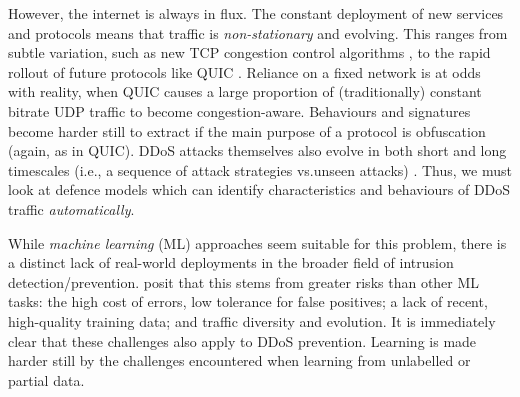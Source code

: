 \documentclass[10pt, times, conference, letterpaper]{IEEEtran}
\begin{document}
However, the internet is always in flux.
The constant deployment of new services and protocols means that traffic is \emph{non-stationary} and evolving.
This ranges from subtle variation, such as new TCP congestion control algorithms \cite{rfc8312}, to the rapid rollout \cite{DBLP:conf/pam/RuthPDH18} of future protocols like QUIC \cite{DBLP:conf/sigcomm/LangleyRWVKZYKS17}.
Reliance on a fixed network is at odds with reality, when QUIC causes a large proportion of (traditionally) constant bitrate UDP traffic to become congestion-aware.
Behaviours and signatures become harder still to extract if the main purpose of a protocol is obfuscation (again, as in QUIC).
DDoS attacks themselves also evolve in both short and long timescales (i.e., a sequence of attack strategies vs.\@ unseen attacks) \cite{DBLP:conf/spw/KangGS16}.
Thus, we must look at defence models which can identify characteristics and behaviours of DDoS traffic \emph{automatically}.


While \emph{machine learning} (ML) approaches seem suitable for this problem, there is a distinct lack of real-world deployments in the broader field of intrusion detection/prevention.
\Textcite{DBLP:conf/sp/SommerP10} posit that this stems from greater risks than other ML tasks: the high cost of errors, low tolerance for false positives; a lack of recent, high-quality training data; and traffic diversity and evolution.
It is immediately clear that these challenges also apply to DDoS prevention.
Learning is made harder still by the challenges encountered when learning from unlabelled or partial data.
\end{document}
